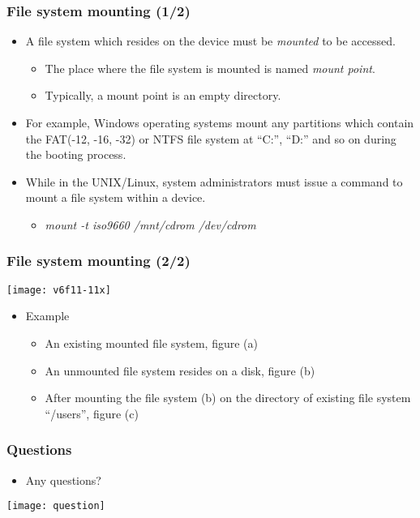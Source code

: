 \documentclass[CJKutf8,dvipsnames,table]{beamer}
\begin{document}
\begin{CJK*}{UTF8}{song}
  \begin{frame}
    \frametitle{File system mounting (1/2)} \pause
    \begin{itemize}
    \item A file system which resides on the device must be \emph{mounted} to be accessed. \pause
      \begin{itemize}
      \item The place where the file system is mounted is named \emph{mount point}.\pause
      \item Typically, a mount point is an empty directory. \pause
      \end{itemize}
    \item For example, Windows operating systems mount any partitions which contain the FAT(-12, -16, -32) or NTFS file system at ``C:'', ``D:'' and so on during the booting process. \pause
    \item While in the UNIX/Linux, system administrators must issue a command to mount a file system within a device. \pause
      \begin{itemize}
      \item \emph{mount -t iso9660 /mnt/cdrom /dev/cdrom}
      \end{itemize}
    \end{itemize}
  \end{frame}

  \begin{frame}
    \frametitle{File system mounting (2/2)} \pause
    \begin{center}
      \texttt{[image: v6f11-11x]} \pause
    \end{center}
    \begin{itemize}\parskip=0pt
    \item Example \pause
      \begin{itemize}\parskip=0pt
      \item An existing mounted file system, figure (a) \pause
      \item An unmounted file system resides on a disk, figure (b) \pause
      \item After mounting the file system (b) on the directory of existing file system ``/users'', figure (c)
      \end{itemize}
    \end{itemize}
  \end{frame}

  \begin{frame}
    \frametitle{Questions}
    \begin{itemize}
    \item Any questions?
    \end{itemize}
    \begin{center}
      \texttt{[image: question]}
    \end{center}
  \end{frame}


\end{CJK*}
\end{document}
